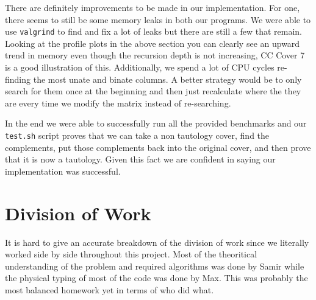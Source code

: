 \documentclass[10pt]{article}
\begin{document}
There are definitely improvements to be made in our implementation. For one,
there seems to still be some memory leaks in both our programs. We were able to
use \texttt{valgrind} to find and fix a lot of leaks but there are still a few
that remain. Looking at the profile plots in the above section you can clearly
see an upward trend in memory even though the recursion depth is not
increasing, CC Cover 7 is a good illustration of this. Additionally, we spend a
lot of CPU cycles re-finding the most unate and binate columns. A better
strategy would be to only search for them once at the beginning and then just
recalculate where the they are every time we modify the matrix instead of
re-searching.

In the end we were able to successfully run all the provided benchmarks and our
\texttt{test.sh} script proves that we can take a non tautology cover, find the
complements, put those complements back into the original cover, and then prove
that it is now a tautology. Given this fact we are confident in saying our
implementation was successful.

\section{Division of Work}
It is hard to give an accurate breakdown of the division of work since we
literally worked side by side throughout this project. Most of the theoritical
understanding of the problem and required algorithms was done by Samir while
the physical typing of most of the code was done by Max. This was probably the
most balanced homework yet in terms of who did what.
\end{document}
